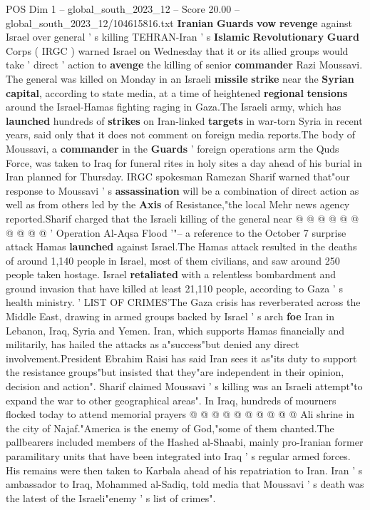 \begin{textsample}{POS Dim 1 – global\_south\_2023\_12 – Score 20.00 – global\_south\_2023\_12/104615816.txt}  \label{ex:f1_pos_166}
\textbf{Iranian} \textbf{Guards} \textbf{vow} \textbf{revenge} against Israel over general ' s killing TEHRAN-Iran ' s \textbf{Islamic} \textbf{Revolutionary} \textbf{Guard} Corps ( IRGC ) warned Israel on Wednesday that it or its allied groups would take ' direct ' action to \textbf{avenge} the killing of senior \textbf{commander} Razi Moussavi.
The general was killed on Monday in an Israeli \textbf{missile} \textbf{strike} near the \textbf{Syrian} \textbf{capital}, according to state media, at a time of heightened \textbf{regional} \textbf{tensions} around the Israel-Hamas fighting raging in Gaza.The Israeli army, which has \textbf{launched} hundreds of \textbf{strikes} on Iran-linked \textbf{targets} in war-torn Syria in recent years, said only that it does not comment on foreign media reports.The body of Moussavi, a \textbf{commander} in the \textbf{Guards} ' foreign operations arm the Quds Force, was taken to Iraq for funeral rites in holy sites a day ahead of his burial in Iran planned for Thursday.
IRGC spokesman Ramezan Sharif warned that"our response to Moussavi ' s \textbf{assassination} will be a combination of direct action as well as from others led by the \textbf{Axis} of Resistance,"the local Mehr news agency reported.Sharif charged that the Israeli killing of the general near @ @ @ @ @ @ @ @ @ @ ' Operation Al-Aqsa Flood '"-- a reference to the October 7 surprise attack Hamas \textbf{launched} against Israel.The Hamas attack resulted in the deaths of around 1,140 people in Israel, most of them civilians, and saw around 250 people taken hostage.
Israel \textbf{retaliated} with a relentless bombardment and ground invasion that have killed at least 21,110 people, according to Gaza ' s health ministry. ' LIST OF CRIMES'The Gaza crisis has reverberated across the Middle East, drawing in armed groups backed by Israel ' s arch \textbf{foe} Iran in Lebanon, Iraq, Syria and Yemen.
Iran, which supports Hamas financially and militarily, has hailed the attacks as a"success"but denied any direct involvement.President Ebrahim Raisi has said Iran sees it as"its duty to support the resistance groups"but insisted that they"are independent in their opinion, decision and action".
Sharif claimed Moussavi ' s killing was an Israeli attempt"to expand the war to other geographical areas".
In Iraq, hundreds of mourners flocked today to attend memorial prayers @ @ @ @ @ @ @ @ @ @ Ali shrine in the city of Najaf."America is the enemy of God,"some of them chanted.The pallbearers included members of the Hashed al-Shaabi, mainly pro-Iranian former paramilitary units that have been integrated into Iraq ' s regular armed forces.
His remains were then taken to Karbala ahead of his repatriation to Iran.
Iran ' s ambassador to Iraq, Mohammed al-Sadiq, told media that Moussavi ' s death was the latest of the Israeli"enemy ' s list of crimes".

\end{textsample}
